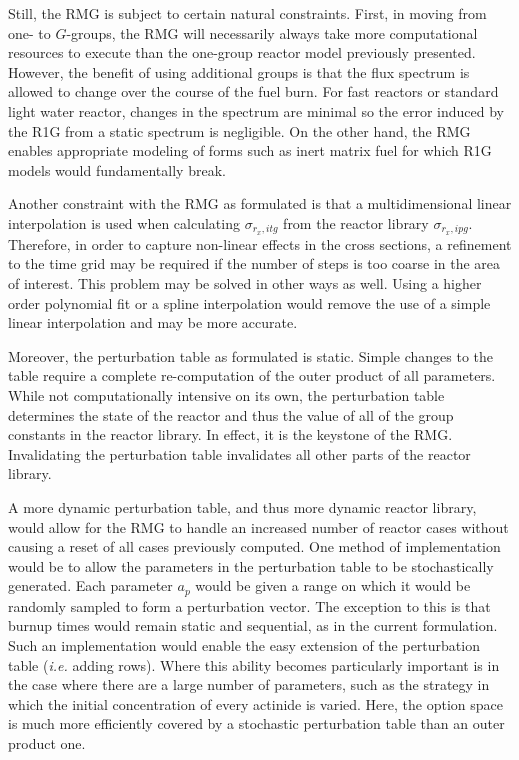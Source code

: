 Still, the RMG is subject to certain natural constraints.  First, in moving from one- to $G$-groups,
the RMG will necessarily always take more computational resources to execute than the one-group
reactor model previously presented.  However, the benefit of using additional groups is that the flux
spectrum is allowed to change over the course of the fuel burn.  For fast reactors or standard light 
water reactor, changes in the spectrum are minimal so the error induced by the R1G from a static spectrum
is negligible.  On the other hand, the RMG enables appropriate modeling of forms such as inert matrix 
fuel for which R1G models would fundamentally break.

Another constraint with the RMG as formulated is that a multidimensional linear interpolation is 
used when calculating $\sigma_{r_x,itg}$ from the reactor library $\sigma_{r_x,ipg}$.  Therefore, 
in order to capture non-linear effects in the cross sections, a refinement to the time grid may 
be required if the number of steps is too coarse in the area of interest.  This problem may be solved
in other ways as well.  Using a higher order polynomial fit or a spline interpolation would 
remove the use of a simple linear interpolation and may be more accurate.

Moreover, the perturbation table as formulated is static.  Simple changes to the table
require a complete re-computation of the outer product of all parameters.  While not computationally
intensive on its own, the perturbation table determines the state of the reactor and thus the 
value of all of the group constants in the reactor library.  In effect, it is the keystone of the RMG. 
Invalidating the perturbation table invalidates all other parts of the reactor library.  

A more dynamic perturbation table, and thus more dynamic reactor library, would allow for the RMG to 
handle an increased number of reactor cases without causing a reset of all cases previously computed.
One method of implementation would be to allow the parameters in the perturbation table to be stochastically
generated.  Each parameter $a_p$ would be given a range on which it would be randomly sampled to form a 
perturbation vector.  The exception to this is that burnup times would remain static and sequential, as
in the current formulation.  Such an implementation would enable the easy extension of the perturbation 
table (\emph{i.e.} adding rows).  Where this ability becomes particularly important is in the case 
where there are a large number of parameters, such as the strategy in which the initial concentration of 
every actinide is varied.  Here, the option space is much more efficiently covered by a stochastic 
perturbation table than an outer product one.

